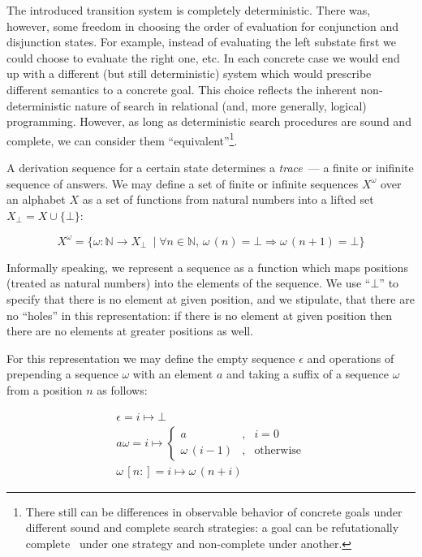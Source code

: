 The introduced transition system is completely deterministic. There was, however, some freedom in choosing the order of evaluation for conjunction and
disjunction states. For example, instead of evaluating the left substate first we could choose to evaluate the right one, etc. In each concrete case we would
end up with a different (but still deterministic) system which would prescribe different semantics to a concrete goal. This choice reflects the inherent
non-deterministic nature of search in relational (and, more generally, logical) programming. However, as long as deterministic search procedures
are sound and complete, we can consider them ``equivalent''\footnote{There still can be differences in observable behavior of concrete goals under different
sound and complete search strategies: a goal can be refutationally complete~\cite{WillThesis} under one strategy and non-complete under another.}.

A derivation sequence for a certain state determines a \emph{trace}~--- a finite or inifinite sequence of answers. We may define a set of finite or infinite
sequences $X^\omega$ over an alphabet $X$ as a set of functions from natural numbers into a lifted set $X_\bot=X\cup\{\bot\}$:

\[
X^\omega=\{\omega : \mathbb{N}\to X_\bot\ \mid \forall n\in\mathbb{N},\, \omega\,(n)=\bot\Rightarrow \omega\,(n+1)=\bot\}
\]

Informally speaking, we represent a sequence as a function which maps positions (treated as natural numbers) into the elements of the sequence. We use ``$\bot$''
to specify that there is no element at given position, and we stipulate, that there are no ``holes'' in this representation: if there is no element at given
position then there are no elements at greater positions as well. 

For this representation we may define the empty sequence $\epsilon$ and operations of prepending a sequence $\omega$ with an element $a$ and taking a suffix of
a sequence $\omega$ from a position $n$ as follows:

\begin{gather*}
  \epsilon = i \mapsto \bot\\[2mm]
  a\omega = i \mapsto \left\{
  \begin{array}{rcl}
    a &,& i = 0\\
    \omega\,(i-1)&,&\mbox{otherwise}
  \end{array}
  \right.\\[2mm]
  \omega\,[n:]=i\mapsto\omega\,(n+i)
\end{gather*}


